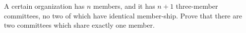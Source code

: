 A certain organization has $n$ members, and it has $n+1$ three-member committees, no two of which have identical member-ship.  Prove that there are two committees which share exactly one member.